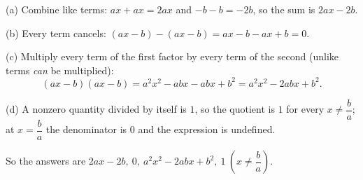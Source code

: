 (a) Combine like terms: $ax+ax=2ax$ and $-b-b=-2b$, so the sum is $2ax-2b$.

(b) Every term cancels: $(ax-b)-(ax-b)=ax-b-ax+b=0$.

(c) Multiply every term of the first factor by every term of the second (unlike terms \emph{can} be multiplied):
\[
(ax-b)(ax-b)=a^2x^2-abx-abx+b^2=a^2x^2-2abx+b^2 .
\]

(d) A nonzero quantity divided by itself is $1$, so the quotient is $1$ for every $x\ne\dfrac {b}{a}$; at $x=\dfrac {b}{a}$ the denominator is $0$ and the expression is undefined.

So the answers are $\boxed{2ax-2b,\ 0,\ a^2x^2-2abx+b^2,\ 1\ (x\ne \dfrac{b}{a})}$.
